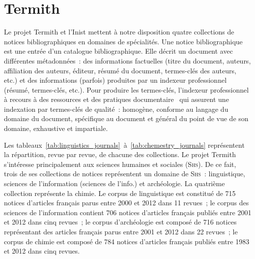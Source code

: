   \section{Termith}
  \label{sec:main-data_description-termith_data}
    Le projet Termith et l'Inist mettent à notre disposition quatre collections
    de notices bibliographiques en domaines de spécialités. Une notice
    bibliographique est une entrée d'un catalogue bibliographique. Elle décrit
    un document avec différentes métadonnées~: des informations factuelles
    (titre du document, auteurs, affiliation des auteurs, éditeur, résumé du
    document, termes-clés des auteurs, etc.) et des informations (parfois)
    produites par un indexeur professionnel (résumé, termes-clés, etc.). Pour
    produire les termes-clés, l'indexeur professionnel à recours à des
    ressources et des pratiques
    documentaire~\cite{guinchat1996techniquesdocumentaires} qui assurent une
    indexation par termes-clés de qualité~: homogène, conforme au langage du
    domaine du document, spécifique au document et général du point de vue de
    son domaine, exhaustive et impartiale.
    
    Les tableaux~\ref{tab:linguistics_journals}~à~\ref{tab:chemestry_journals}
    représentent la répartition, revue par revue, de chacune des collections. Le
    projet Termith s'intéresse principalement aux sciences humaines et sociales
    (\textsc{Shs}). De ce fait, trois de ses collections de notices représentent
    un domaine de \textsc{Shs}~: linguistique, sciences de l'information
    (sciences de l'info.) et archéologie. La quatrième collection représente la
    chimie. Le corpus de linguistique est constitué de 715 notices d'articles
    français parus entre 2000 et 2012 dans 11 revues~; le corpus des sciences de
    l'information contient 706 notices d'articles français publiés entre 2001 et
    2012 dans cinq revues~; le corpus d'archéologie est composé de 716 notices
    représentant des articles français parus entre 2001 et 2012 dans 22 revues~;
    le corpus de chimie est composé de 784 notices d'articles français publiés
    entre 1983 et 2012 dans cinq revues.

